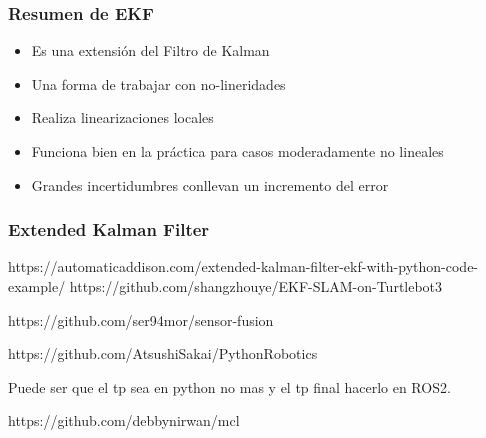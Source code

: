 \begin{frame}
	\frametitle{Resumen de EKF}
	
	\begin{itemize}
		\item Es una extensión del Filtro de Kalman
		\item Una forma de trabajar con no-lineridades
		\item Realiza linearizaciones locales
		\item Funciona bien en la práctica para casos moderadamente no lineales
		\item Grandes incertidumbres conllevan un incremento del error
	\end{itemize}
	
\end{frame}

\begin{frame}
	\frametitle{Extended Kalman Filter}
	
	
	https://automaticaddison.com/extended-kalman-filter-ekf-with-python-code-example/
	https://github.com/shangzhouye/EKF-SLAM-on-Turtlebot3
	
	https://github.com/ser94mor/sensor-fusion
	
	https://github.com/AtsushiSakai/PythonRobotics
	
	Puede ser que el tp sea en python no mas y el tp final hacerlo en ROS2.
	
	https://github.com/debbynirwan/mcl
	
	
\end{frame}
